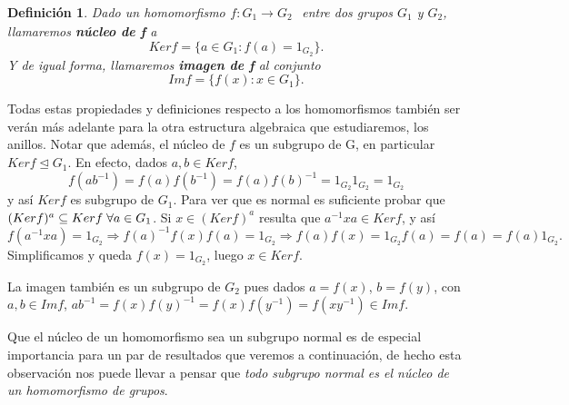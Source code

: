 \documentclass[12pt]{article}
\newtheorem{definition}[theorem]{Definición}
\begin{document}
\begin{definition} \label{eq:kernormal}
Dado un homomorfismo$
\begin{array}{rccl}
f\colon G_{1} \longrightarrow  G_{2}
\end{array}
$ entre dos grupos $G_{1}$ y $G_{2}$, llamaremos \textbf{núcleo de f} a $$Ker f = \lbrace a \in G_{1} : f(a) = 1_{G_{2}}\rbrace.$$ Y de igual forma, llamaremos \textbf{imagen de f} al conjunto $$Im f = \lbrace f(x) : x \in G_{1}\rbrace.$$
\end{definition}

Todas estas propiedades y definiciones respecto a los homomorfismos también ser verán más adelante para la otra estructura algebraica que estudiaremos, los anillos. Notar que además, el núcleo de $f$ es un subgrupo de G, en particular $Ker f \unlhd G_{1}$. En efecto, dados $a,b \in Ker f$, $$f(ab^{-1}) = f(a)f(b^{-1}) = f(a)f(b)^{-1} = 1_{G_{2}}1_{G_{2}} = 1_{G_{2}}$$ y así $Ker f$ es subgrupo de $G_{1}$. Para ver que es normal es suficiente probar que $(Ker f)^{a} \subseteq Ker f\hspace{0.1cm} \forall a \in G_{1}$.
Si $x\in (Ker f)^{a}$ resulta que $a^{-1}xa \in Ker f$, y así $$f(a^{-1}xa) = 1_{G_{2}} \Rightarrow f(a)^{-1}f(x)f(a) = 1_{G_{2}} \Rightarrow f(a)f(x) = 1_{G_{2}}f(a) = f(a) = f(a) 1_{G_{2}}.$$ Simplificamos y queda $f(x) = 1_{G_{2}}$, luego $x \in Ker f$.

La imagen también es un subgrupo de $G_{2}$ pues dados $a = f(x)$, $b = f(y)$, con $a,b \in Im f$, $ab^{-1} = f(x)f(y)^{-1} = f(x)f(y^{-1}) = f(xy^{-1}) \in Im f.$

Que el núcleo de un homomorfismo sea un subgrupo normal es de especial importancia para un par de resultados que veremos a continuación, de hecho esta observación nos puede llevar a pensar que \textit{todo subgrupo normal es el núcleo de un homomorfismo de grupos}.
\end{document}
